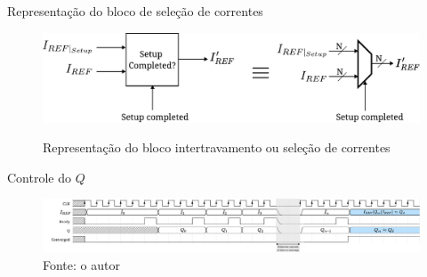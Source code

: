 \begin{frame}{Representação do bloco de seleção de correntes}

\begin{figure}[H]
    \centering
    \caption{Representação do bloco intertravamento ou seleção de correntes}
    \includegraphics[width=.9\textwidth]{fig/setup-completed-equiv.pdf}
    \label{f-bloco-setup-completed}
\end{figure}
    
\end{frame}

\begin{frame}{Controle do $Q$}
\begin{figure}[H]
    \centering
    \caption{Diagrama de tempo da operação do bloco de controle do $Q$.}
    \includegraphics{fig/timing-q-control.pdf}
    \caption*{Fonte: o autor}
    \label{f-timing-q-control}
\end{figure}
    
\end{frame}



\begin{frame}[shrink]{}
\scriptsize
\begin{algorithm}[H]
    \scriptsize
    \caption{Método adaptado da bisseção}
    
    \label{alg-bi}
\end{algorithm}
\end{frame}

\begin{frame}[shrink]{}
\scriptsize
\begin{algorithm}[H]
    \scriptsize
    \caption{Método adaptado das secantes}
    
    \label{alg-sec}
\end{algorithm}
\end{frame}

